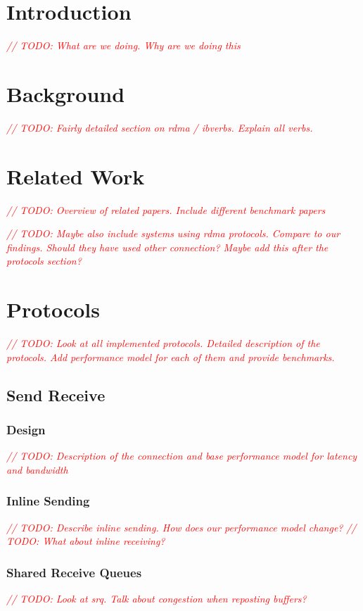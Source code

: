 \documentclass{article}
\newcommand{\todo}[1]{\textit{\textcolor{red}{// TODO: #1} }}
\theoremstyle{plain}
\theoremstyle{definition}
\theoremstyle{remark}
\begin{document}
\iffalse
\fi


\tableofcontents
\pagebreak
\section{Introduction}
\todo{What are we doing. Why are we doing this}

\pagebreak
\section{Background}
\todo{Fairly detailed section on rdma / ibverbs. Explain all verbs.}


\pagebreak
\section{Related Work}

\todo{Overview of related papers. Include different benchmark papers}

\todo{Maybe also include systems using rdma protocols. Compare to our findings. Should they have used other connection? 
Maybe add this after the protocols section?}

\pagebreak


\pagebreak
\section{Protocols}
\todo{Look at all implemented protocols. Detailed description of the protocols. Add performance model for each of them and provide benchmarks.}

\pagebreak
\subsection{Send Receive}
\subsubsection{Design}
\todo{Description of the connection and base performance model for latency and bandwidth}
\subsubsection{Inline Sending}
\todo{Describe inline sending. How does our performance model change?}
\todo{What about inline receiving?}
\subsubsection{Shared Receive Queues}
\todo{Look at srq. Talk about congestion when reposting buffers?}
\end{document}
